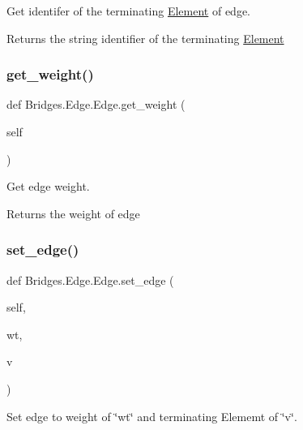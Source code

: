 Get identifer of the terminating \mbox{\hyperlink{namespace_bridges_1_1_element}{Element}} of edge. 

\begin{DoxyReturn}{Returns}
the string identifier of the terminating \mbox{\hyperlink{namespace_bridges_1_1_element}{Element}} 
\end{DoxyReturn}
\mbox{\label{class_bridges_1_1_edge_1_1_edge_ae1279ba60e0fa7312c1185a3cbfe8a39}} 
\subsubsection{\texorpdfstring{get\+\_\+weight()}{get\_weight()}}
{\footnotesize\ttfamily def Bridges.\+Edge.\+Edge.\+get\+\_\+weight (\begin{DoxyParamCaption}\item[{}]{self }\end{DoxyParamCaption})}



Get edge weight. 

\begin{DoxyReturn}{Returns}
the weight of edge 
\end{DoxyReturn}
\mbox{\label{class_bridges_1_1_edge_1_1_edge_aba4ff033130d2e7efcc85360631458e8}} 
\subsubsection{\texorpdfstring{set\+\_\+edge()}{set\_edge()}}
{\footnotesize\ttfamily def Bridges.\+Edge.\+Edge.\+set\+\_\+edge (\begin{DoxyParamCaption}\item[{}]{self,  }\item[{}]{wt,  }\item[{}]{v }\end{DoxyParamCaption})}



Set edge to weight of \char`\"{}wt\char`\"{} and terminating Elememt of \char`\"{}v\char`\"{}. 


